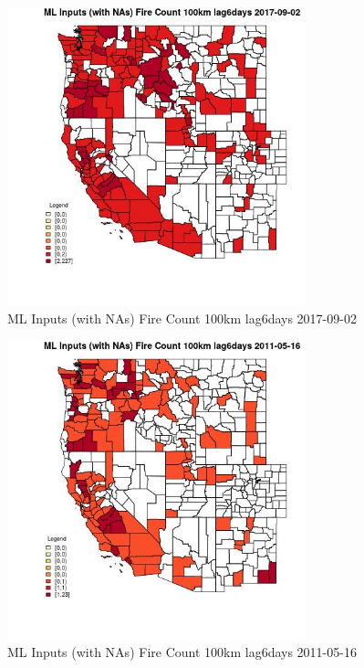 \begin{figure} 
\centering  
\includegraphics[width=0.77\textwidth]{Code_Outputs/Report_ML_input_PM25_Step4_part_e_de_duplicated_aves_compiled_2019-05-20wNAs_CountyFire_Count_100km_lag6daysMean2017-09-02.jpg} 
\caption{\label{fig:Report_ML_input_PM25_Step4_part_e_de_duplicated_aves_compiled_2019-05-20wNAsCountyFire_Count_100km_lag6daysMean2017-09-02}ML Inputs (with NAs) Fire Count 100km lag6days 2017-09-02} 
\end{figure} 
 

\begin{figure} 
\centering  
\includegraphics[width=0.77\textwidth]{Code_Outputs/Report_ML_input_PM25_Step4_part_e_de_duplicated_aves_compiled_2019-05-20wNAs_CountyFire_Count_100km_lag6daysMean2011-05-16.jpg} 
\caption{\label{fig:Report_ML_input_PM25_Step4_part_e_de_duplicated_aves_compiled_2019-05-20wNAsCountyFire_Count_100km_lag6daysMean2011-05-16}ML Inputs (with NAs) Fire Count 100km lag6days 2011-05-16} 
\end{figure} 
 

